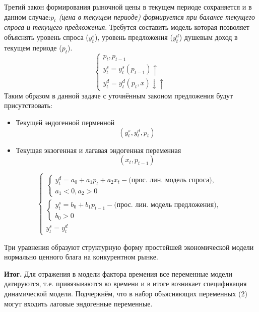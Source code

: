 \documentclass[12pt,a4paper]{article}
\begin{document}
Третий закон формирования рыночной цены в текущем периоде сохраняется и в данном случае:\textit{$p_t$ (цена в текущем периоде) формируется при балансе текущего спроса и текущего предложения}. Требутся составить модель которая позволяет объяснять уровень спроса ($y_t^s$), уровень предложения ($y_t^d$) душевым доход в текущем периоде ($p_t$).
\begin{equation*}
\begin{cases}
p_t, p_{t-1} \\
y_t^s = y_t^s(p_{t-1})\uparrow \\
y_t^d = y_t^d(p_t, x)\downarrow \uparrow
\end{cases}
\end{equation*}
Таким образом в данной задаче с уточнённым законом предложения будут присутствовать:
\begin{itemize}
\item Текущей эндогенной перменной
\begin{equation}
(y_t^s, y_t^d, p_t)
\end{equation}
\item Текущая экзогенная и лагавая эндогенная переменная
\begin{equation}
(x_t, p_{t - 1})
\end{equation}
\end{itemize}
\begin{equation}
\begin{cases}
\begin{cases}
y_t^d = a_0 + a_1 p_t + a_2  x_t - \text{(прос. лин. модель спроса)}, \\
a_1 < 0, a_2 > 0
\end{cases} \\
\begin{cases}
y_t^s = b_0 + b_1 p_{t - 1} - \text{(прос. лин. модель предложения)}, \\
b_0 > 0
\end{cases} \\
y_t^s = y_t^d
\end{cases}
\end{equation}

Три уравнения образуют структурную форму простейшей экономической модели нормально ценного блага на конкурентном рынке.

\textbf{Итог.} Для отражения в модели фактора времения все переменные модели датируются, т.е. привязываются ко времени и в итоге возникает спецификация динамической модели. Подчеркнём, что в набор объясняющих переменных (2) могут входить лаговые эндогенные переменные.
\end{document}
